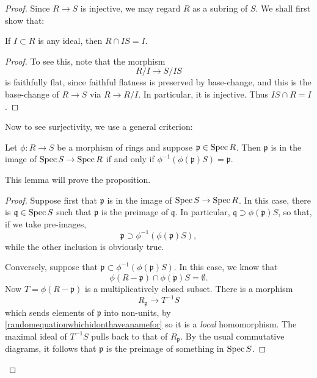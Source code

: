 \begin{proof} Since $R \to S$ is injective, we may regard $R$ as a subring of $S$.
We shall first show that:

\begin{lemma} 
If $I \subset R$ is any ideal, then $R \cap IS = I$.
\end{lemma}
\begin{proof} 
To see this, note that the morphism
\[ R/I \to S/IS  \]
is faithfully flat, since faithful flatness is preserved by base-change, and
this is the base-change of $R \to S$ via $R \to R/I$.
In particular, it is injective. Thus $IS \cap R = I$.
\end{proof} 


Now to see surjectivity, we use a general criterion:

\begin{lemma} \label{imagespec}
Let $\phi: R \to S$ be a morphism of rings and suppose $\mathfrak{p} \in \operatorname{Spec}
R$. Then $\mathfrak{p}$ is in the image of $\operatorname{Spec} S \to \operatorname{Spec} R$ if and only if 
$\phi^{-1}( \phi(\mathfrak{p}) S) = \mathfrak{p}$.
\end{lemma} 

This lemma will prove the proposition.
\begin{proof} 
Suppose first that $\mathfrak{p}$ is in the image of $\operatorname{Spec} S \to \operatorname{Spec} R$. In
this case, there is $\mathfrak{q} \in \operatorname{Spec} S$ such that
$ \mathfrak{p}$ is the preimage of $\mathfrak{q}$.
In particular, $\mathfrak{q} \supset \phi(\mathfrak{p})S$, so that, if we take
pre-images,
\[ \mathfrak{p} \supset \phi^{-1}(\phi(\mathfrak{p}) S),  \]
while the other inclusion is obviously true.

Conversely, suppose that $\mathfrak{p} \subset \phi^{-1}(\phi(\mathfrak{p})
S)$. In this case, we know that 
\[ \phi(R  - \mathfrak{p}) \cap \phi(\mathfrak{p})S = \emptyset.  \]
Now $T = \phi(R - \mathfrak{p})$ is a multiplicatively closed subset.
There is a morphism
\begin{equation} \label{randomequationwhichidonthaveanamefor}
R_{\mathfrak{p}} \to T^{-1}S 
\end{equation} 
which sends elements of $\mathfrak{p}$ into non-units, by
\eqref{randomequationwhichidonthaveanamefor} so it is a \emph{local}
homomorphism. The maximal ideal of $T^{-1} S$ pulls back to that of
$R_{\mathfrak{p}}$. By the usual commutative diagrams, it follows that
$\mathfrak{p}$ is the preimage of something in $\operatorname{Spec} S$.
\end{proof} 
\end{proof} 

